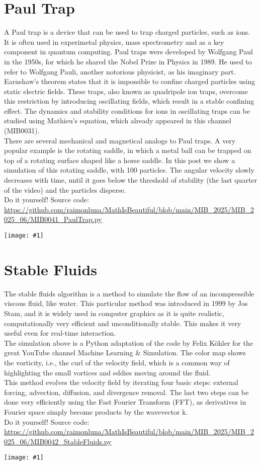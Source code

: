 \documentclass[12pt,landscape]{article}
\newcommand{\artpage}[3][]{%
  \begin{minipage}[t]{0.48\linewidth}
    \vspace{0pt} %
    \section*{#2} %
    \addcontentsline{toc}{section}{#2} %
    #3 %
  \end{minipage}%
  \hfill
  \begin{minipage}[t]{0.48\linewidth}
    \vspace{0pt} %
    \centering
    \texttt{[image: \#1]}
  \end{minipage}%
  \newpage
}
\begin{document}
\artpage[../Output/LowQuality/MIB0041_PaulTrap.png]{Paul Trap}{%
A Paul trap is a device that can be used to trap charged particles, such as ions. It is often used in experimetal physics, mass spectrometry and as a key component in quantum computing. Paul traps were developed by Wolfgang Paul in the 1950s, for which he shared the Nobel Prize in Physics in 1989. He used to refer to Wolfgang Pauli, another notorious physicist, as his imaginary part.\\

Earnshaw's theorem states that it is impossible to confine charged particles using static electric fields. These traps, also known as quadripole ion traps, overcome this restriction by introducing oscillating fields, which result in a stable confining effect. The dynamics and stability conditions for ions in oscillating traps can be studied using Mathieu's equation, which already appeared in this channel (MIB0031).\\

There are several mechanical and magnetical analogs to Paul traps. A very popular example is the rotating saddle, in which a metal ball can be trapped on top of a rotating surface shaped like a horse saddle. In this post we show a simulation of this rotating saddle, with 100 particles. The angular velocity slowly decreases with time, until it goes below the threshold of stability (the last quarter of the video) and the particles disperse. \\

Do it yourself! Source code: \url{https://github.com/raimonluna/MathIsBeautiful/blob/main/MIB_2025/MIB_2025_06/MIB0041_PaulTrap.py}
}

\artpage[../Output/LowQuality/MIB0042_StableFluids.png]{Stable Fluids}{%
The stable fluids algorithm is a method to simulate the flow of an incompressible viscous fluid, like water. This particular method was introduced in 1999 by Jos Stam, and it is widely used in computer graphics as it is quite realistic, computationally very efficient and unconditionally stable. This makes it very useful even for real-time interaction.\\

The simulation above is a Python adaptation of the code by Felix Köhler for the great YouTube channel Machine Learning \& Simulation. The color map shows the vorticity, i.e., the curl of the velocity field, which is a common way of highlighting the small vortices and eddies moving around the fluid.\\

This method evolves the velocity field by iterating four basic steps: external forcing, advection, diffusion, and divergence removal. The last two steps can be done very efficiently using the Fast Fourier Transform (FFT), as derivatives in Fourier space simply become products by the wavevector k.\\

Do it yourself! Source code: \url{https://github.com/raimonluna/MathIsBeautiful/blob/main/MIB_2025/MIB_2025_06/MIB0042_StableFluids.py}
}
\end{document}
